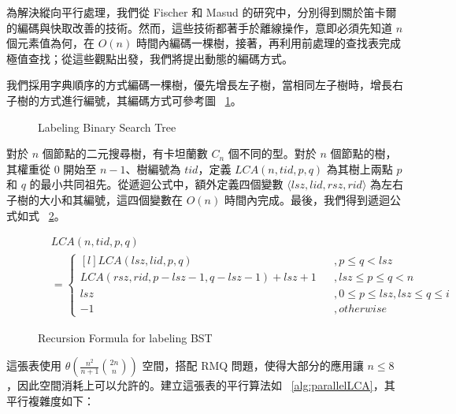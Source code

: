 \documentclass{gapd}
\begin{document}
為解決縱向平行處理，我們從 Fischer \cite{fischer} 和 Masud \cite{masud} 的研究中，分別得到關於笛卡爾的編碼與快取改善的技術。然而，這些技術都著手於離線操作，意即必須先知道 $n$ 個元素值為何，在 $O(n)$ 時間內編碼一棵樹，接著，再利用前處理的查找表完成極值查找；從這些觀點出發，我們將提出動態的編碼方式。

我們採用字典順序的方式編碼一棵樹，優先增長左子樹，當相同左子樹時，增長右子樹的方式進行編號，其編碼方式可參考圖 ~\ref{fig:lablingBST}。

\begin{figure}[!thb]
  
  
  
  \caption{Labeling Binary Search Tree}
  \label{fig:lablingBST}
\end{figure}

對於 $n$ 個節點的二元搜尋樹，有卡坦蘭數 $C_n$ 個不同的型。對於 $n$ 個節點的樹，其權重從 $0$ 開始至 $n-1$、樹編號為 $\mathit{tid}$，定義 $\mathit{LCA}(n, \mathit{tid}, p, q)$ 為其樹上兩點 $p$ 和 $q$ 的最小共同祖先。從遞迴公式中，額外定義四個變數 $\langle\mathit{lsz},\mathit{lid},\mathit{rsz},\mathit{rid}\rangle$ 為左右子樹的大小和其編號，這四個變數在 $O(n)$ 時間內完成。最後，我們得到遞迴公式如式 ~\ref{fig:formulaLCA}。 

\begin{figure}[!thb]
\begin{equation*}
  \begin{split}
    &\mathit{LCA}(n, \mathit{tid}, p, q) \\
      &= \left\{\begin{matrix*}[l]
        \mathit{LCA}(\mathit{lsz}, \mathit{lid}, p, q) &&, p \le q < \mathit{lsz}\\ 
        \mathit{LCA}(\mathit{rsz}, \mathit{rid}, p-\mathit{lsz}-1, q-\mathit{lsz}-1)+\mathit{lsz}+1 &&, 
            \mathit{lsz} \le p \le q < n \\ 
        \mathit{lsz} && , 0 \le p \le \mathit{lsz}, \mathit{lsz} \le q \le i\\ 
        -1 && ,\mathit{otherwise}
      \end{matrix*}\right.
  \end{split}
\end{equation*}
\caption{Recursion Formula for labeling BST}
\label{fig:formulaLCA}
\end{figure}

這張表使用 $\theta\left(\frac{n^2}{n+1} \binom{2n}{n}\right)$ 空間，搭配 RMQ 問題，使得大部分的應用讓 $n \le 8$，因此空間消耗上可以允許的。建立這張表的平行算法如 ~\ref{alg:parallelLCA}，其平行複雜度如下：
\end{document}
